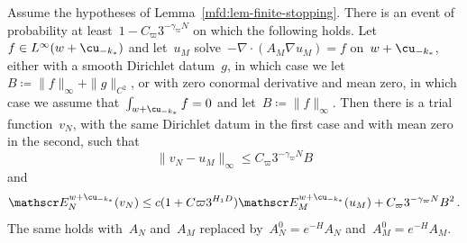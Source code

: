 \documentclass[11pt]{amsart}
\begin{document}
\begin{lemma}
\label{mfd:lem-finite-source-comparison}
Assume the hypotheses of Lemma~\ref{mfd:lem-finite-stopping}. There is an event of probability at least~$1-C_\varpi3^{-\gamma_\varpi N}$ on which the following holds. Let~$f\in L^\infty(w+\cu_{-k_*})$ and let~$u_M$ solve~$-\nabla\cdot(A_M\nabla u_M)=f$ on~$w+\cu_{-k_*}$, either with a smooth Dirichlet datum~$g$, in which case we let~$B\coloneqq\|f\|_\infty+\|g\|_{C^2}$, or with zero conormal derivative and mean zero, in which case we assume that~$\int_{w+\cu_{-k_*}}f=0$ and let~$B\coloneqq\|f\|_\infty$. Then there is a trial function~$v_N$, with the same Dirichlet datum in the first case and with mean zero in the second, such that
\begin{equation*}
	\|v_N-u_M\|_\infty\leq C_\varpi3^{-\gamma_\varpi N}B
\end{equation*}
and
\begin{equation*}
	\mathscr E_N^{w+\cu_{-k_*}}(v_N)\leq c(1+C\varpi3^{H_1D})\mathscr E_M^{w+\cu_{-k_*}}(u_M)
	+C_\varpi3^{-\gamma_\varpi N}B^2\,.
\end{equation*}
The same holds with~$A_N$ and~$A_M$ replaced by~$A_N^0=e^{-H}A_N$ and~$A_M^0=e^{-H}A_M$.
\end{lemma}
\end{document}
